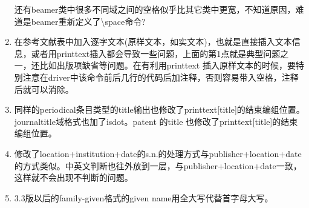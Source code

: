 \begin{enumerate}
还有beamer类中很多不同域之间的空格似乎比其它类中更宽，不知道原因，难道是beamer重新定义了\textbackslash space命令?

\item 在参考文献表中加入逐字文本(原样文本，如实文本)，也就是直接插入文本信息，或者用printtext插入都会导致一些问题，上面的第1点就是典型问题之一，还比如出版项缺省等问题。在有利用printtext 插入原样文本的时候，要特别注意在driver中该命令前后几行的代码后加注释，否则容易带入空格，注释后就可以消除。

\item 同样的periodical条目类型的title输出也修改了printtext[title]的结束编组位置。journaltitle域格式也加了isdot。patent 的title 也修改了printtext[title]的结束编组位置。

\item 修改了location+institution+date的s.n.的处理方式与publisher+location+date的方式类似。中英文判断也往外放到一层，与publisher+location+date一致，这样就不会出现不判断的问题。

\item 3.3版以后的family-given格式的given name用全大写代替首字母大写。
\end{enumerate}


